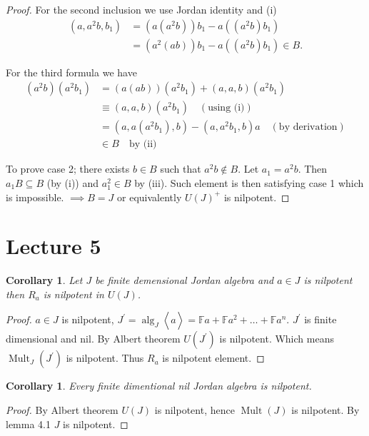 \documentclass{article}
\newtheorem{corollary}[theorem]{Corollary}
\def\<{\mathop{\langle}}
\def\>{\mathop{\rangle}}
\begin{document}
\begin{proof}
For the second inclusion we use Jordan identity and (i)  
\begin{align*}  
    (a, a^2b, b_1) &= (a(a^2b))b_1 - a((a^2b)b_1) \\
    &= (a^2(ab))b_1 - a((a^2b)b_1) \in B.  
\end{align*}  

For the third formula we have  
\begin{align*}  
    (a^2b)(a^2b_1) &= (a(ab))(a^2b_1) + (a,a,b)(a^2b_1) \\
    &\equiv (a,a,b)(a^2b_1) \quad (\text{using (i)}) \\
    &= (a, a(a^2b_1), b) - (a, a^2b_1, b)a \quad (\text{by derivation}) \\
    &\in B \quad \text{by (ii)}  
\end{align*}  

To prove case 2; there exists $b \in B$ such that $a^2b \notin B$. Let $a_1 = a^2b$. Then $a_1B \subseteq B$ (by (i)) and $a_1^2 \in B$ by (iii). Such element is then satisfying case 1 which is impossible.  
$\implies B=J$ or equivalently $U(J)^+$ is nilpotent.  
\end{proof}

\section{Lecture 5}

\begin{corollary}
Let $ J $ be finite demensional Jordan algebra and $ a \in J $ is nilpotent then $ R_a $ is nilpotent in $ U(J) $.   
\end{corollary}

\begin{proof} 
$ a \in J $ is nilpotent, $ J^{\prime} =\operatorname{alg}_J\< a\>=\mathbb{F}a+\mathbb{F}a^2 + \ldots +\mathbb{F}a^n$. $ J^{\prime } $ is finite dimensional and nil. By Albert theorem $ U(J^{\prime }) $ is nilpotent. Which means $ \operatorname{Mult}_J(J^{\prime}) $ is nilpotent. Thus $ R_a $ is nilpotent element.
\end{proof}

\begin{corollary}
Every finite dimentional nil Jordan algebra is nilpotent.
\end{corollary}

\begin{proof} 
By Albert theorem $ U(J) $ is nilpotent, hence $ \operatorname{Mult}(J) $ is nilpotent. By lemma 4.1 $ J $ is nilpotent.  
\end{proof}
\end{document}
